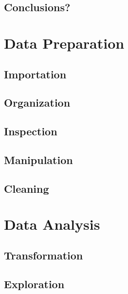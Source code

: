\documentclass[
]{book}
\begin{document}
\hypertarget{conclusions}{%
\section{Conclusions?}\label{conclusions}}

\hypertarget{data_prep}{%
\chapter{Data Preparation}\label{data_prep}}

\hypertarget{importation}{%
\section{Importation}\label{importation}}

\hypertarget{organization}{%
\section{Organization}\label{organization}}

\hypertarget{inspection}{%
\section{Inspection}\label{inspection}}

\hypertarget{manipulation}{%
\section{Manipulation}\label{manipulation}}

\hypertarget{cleaning}{%
\section{Cleaning}\label{cleaning}}

\hypertarget{data_analysis}{%
\chapter{Data Analysis}\label{data_analysis}}

\hypertarget{transformation}{%
\section{Transformation}\label{transformation}}

\hypertarget{exploration}{%
\section{Exploration}\label{exploration}}
\end{document}
